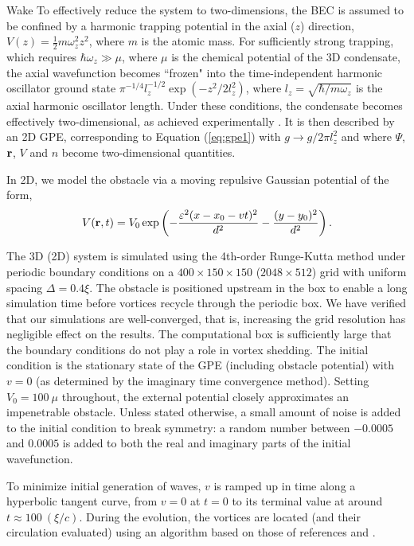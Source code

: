 \begin{chapter}{\label{cha:wake}Wake}
To effectively reduce the system to two-dimensions, the BEC is assumed to be confined by a harmonic trapping potential in the axial ($z$) direction, $V(z)=\frac{1}{2}m \omega_z^2 z^2$, where $m$ is the atomic mass.  For sufficiently strong trapping, which requires $\hbar \omega_z \gg \mu$, where $\mu$ is the chemical potential of the 3D condensate, the axial wavefunction becomes ``frozen" into the time-independent harmonic oscillator ground state $\pi^{-1/4} l_z^{-1/2} \exp\left(-z^2/2l_z^2\right)$, where $l_z=\sqrt{\hbar/m \omega_z}$ is the axial harmonic oscillator length. Under these conditions, the condensate becomes effectively two-dimensional, as achieved experimentally \cite{Gorlitz}.  It is then described by an 2D GPE, corresponding to Equation (\ref{eq:gpe1}) with $g \rightarrow g/2\pi l_z^2$ and where $\Psi$, ${\bf r}$, $V$ and $n$ become two-dimensional quantities.  

In 2D, we model the obstacle via a moving repulsive Gaussian potential of the form,
\begin{equation}
V({\bf r}, t)=V_0 \exp \left( -\frac{\varepsilon^2(x-x_0-vt)^2}{d^2} -\frac{(y-y_0)^2}{d^2}\right).
\label{eq:potential2D}
\end{equation}

The 3D (2D) system is simulated using the 4th-order Runge-Kutta method under periodic boundary conditions on a $400 \times 150 \times 150$ ($2048 \times 512$)  grid with uniform spacing $\Delta=0.4\xi$.  The obstacle is positioned upstream in the box to enable a long simulation time before vortices recycle through the periodic box.  We have verified that our simulations are well-converged, that is, increasing the grid resolution has negligible effect on the results.
The computational box is sufficiently large that the boundary conditions do not play a role in vortex shedding.  The initial condition is the stationary state of the GPE (including obstacle potential) with $v=0$ (as determined by the imaginary time convergence method). Setting $V_0=100~\mu$ throughout, the external potential closely approximates an impenetrable obstacle. Unless stated otherwise, a small amount of noise is added to the initial condition to break symmetry: a random number between $-0.0005$ and $0.0005$ is added to both the real and imaginary parts of the initial wavefunction. 

To minimize initial generation of waves, $v$ is ramped up in time along a hyperbolic tangent curve, from $v=0$ at $t=0$ to its terminal value at around $t\approx100~(\xi/c)$. During the evolution, the vortices are located (and their circulation evaluated) using an algorithm based on those of references \cite{fos10} and \cite{white12}.
\end{chapter}
